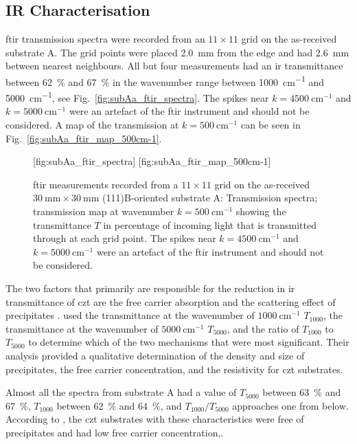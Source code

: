 \subsection{IR Characterisation}

\Ac{ftir} transmission spectra were recorded from an $11\times11$ grid on the as-received substrate A. The grid points were placed \SI{2.0}{\milli\metre} from the edge and had \SI{2.6}{\milli\metre} between nearest neighbours. All but four measurements had an \ac{ir} transmittance between \SI{62}{\percent} and \SI{67}{\percent} in the wavenumber range between \SI{1000}{\centi\metre^{-1}} and \SI{5000}{\centi\metre^{-1}}, see Fig.~\ref{fig:subAa_ftir_spectra}. The spikes near $k=\SI{4500}{\centi\metre^{-1}}$ and $k=\SI{5000}{\centi\metre^{-1}}$ were an artefact of the \ac{ftir} instrument and should not be considered. A map of the transmission at $k=\SI{500}{\centi\metre^{-1}}$ can be seen in Fig.~\ref{fig:subAa_ftir_map_500cm-1}.

\begin{figure}[htbp]
    \centering
    [fig:subAa_ftir_spectra]
    \hfill
    [fig:subAa_ftir_map_500cm-1]
    \caption[\Ac{ftir} measurements of the as-received substrate A.]{\Ac{ftir} measurements recorded from a $11\times11$ grid on the as-received $\SI{30}{\milli\metre}\times\SI{30}{\milli\metre}$ (111)B-oriented substrate A:  Transmission spectra;  transmission map at wavenumber $k=\SI{500}{\centi\metre^{-1}}$ showing the transmittance $T$ in percentage of incoming light that is transmitted through at each grid point. The spikes near $k=\SI{4500}{\centi\metre^{-1}}$ and $k=\SI{5000}{\centi\metre^{-1}}$ were an artefact of the \ac{ftir} instrument and should not be considered.}
\end{figure}

The two factors that primarily are responsible for the reduction in \ac{ir} transmittance of \ac{czt} are the free carrier absorption and the scattering effect of precipitates \citep{yadava1994precipitation}. \citet{yujie2004infrared} used the transmittance at the wavenumber of $\SI{1000}{\centi\metre^{-1}}$ $T_{1000}$, the transmittance at the wavenumber of $\SI{5000}{\centi\metre^{-1}}$ $T_{5000}$, and the ratio of $T_{1000}$ to $T_{5000}$ to determine which of the two mechanisms that were most significant. Their analysis provided a qualitative determination of the density and size of  precipitates, the free carrier concentration, and the resistivity for \ac{czt} substrates. %

Almost all the spectra from substrate A had a value of $T_{5000}$ between \SI{63}{\percent} and \SI{67}{\percent}, $T_{1000}$ between \SI{62}{\percent} and \SI{64}{\percent}, and $T_{1000}/T_{5000}$ approaches one from below. According to \citet{yujie2004infrared}, the \ac{czt} substrates with these characteristics were free of precipitates and had low free carrier concentration,.%
